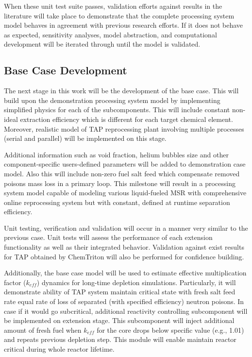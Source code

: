 When these unit test suite passes, validation efforts against results 
in the literature will take place to demonstrate that the complete 
processing system model behaves in agreement with previous research 
efforts. If it does not behave as expected, sensitivity analyses, 
model abstraction, and computational development will be iterated 
through until the model is validated.

\subsection{Base Case Development}
The next stage in this work will be the development of the base case. 
This will build upon the demonstration processing system model by 
implementing simplified physics for each of the subcomponents. This 
will include constant non-ideal extraction efficiency which is 
different for each target chemical element. Moreover, realistic 
model of \gls{TAP} reprocessing plant involving multiple 
processes (serial and parallel) will be implemented on this 
stage. 

Additional information such as void fraction, helium 
bubbles size and other component-specific users-defined 
parameters will be added to demonstration case model.
Also this will include non-zero fuel salt feed which 
compensate removed poisons mass loss in a primary loop.
This milestone will result in a processing system model capable of 
modeling various liquid-fueled \gls{MSR} with comprehensive 
online reprocessing system but with constant, defined at runtime 
separation efficiency.

Unit testing, verification and validation will occur in a manner 
very similar to the previous case. Unit tests will assess the 
performance of each extension functionality as well as their 
integrated behavior. Validation against exist results for \gls{TAP} 
obtained by ChemTriton \cite{betzler_two-dimensional_2016, 
betzler_molten_2017} will also be performed for confidence 
building.

Additionally, the base case model will be used to estimate 
effective 
multiplication factor ($k_{eff}$) dynamics for long-time 
depletion simulations. Particularly, it will demonstrate 
ability of \gls{TAP} system maintain critical state with 
fresh salt feed rate equal rate of loss 
of separated (with specified efficiency) neutron poisons. 
In case if it would go subcritical, additional reactivity 
controlling subcomponent 
will be implemented on extension stage. This subcomponent 
will inject additional amount of fresh fuel when $k_{eff}$ 
for the core drops below specific value (e.g., 1.01) and 
repeats previous depletion step. This module will enable 
maintain reactor critical during whole reactor lifetime.
 

